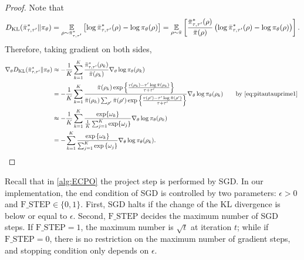 \begin{proof}
	Note that
	\begin{equation*}
	\label{eq:importance_sampling_kl}
	D_{\mathrm{KL}}(\bar{\pi}_{\tau,\tau^{\prime}}^* \| \pi_\theta) = \operatorname*{\mathbb{E}}_{\rho \sim \bar{\pi}_{\tau,\tau^{\prime}}^* } \left[ \log \bar{\pi}_{\tau,\tau^{\prime}}^*(\rho) - \log \pi_\theta(\rho) \right] = \operatorname*{\mathbb{E}}_{\rho\sim \bar{\pi}} \left[  \frac{\bar{\pi}_{\tau,\tau^{\prime}}^*(\rho)}{\bar{\pi}(\rho)} \left(\log \bar{\pi}_{\tau,\tau^{\prime}}^*(\rho) - \log \pi_\theta(\rho) \right) \right].
	\end{equation*}	
	Therefore, taking gradient on both sides,
	\begin{equation}
	\begin{split}
	\nabla_{\theta} \KL(\bar{\pi}_{\tau,\tau^{\prime}}^* \| \pi_\theta) &\approx -\frac{1}{K}\sum_{k=1}^K \frac{\bar{\pi}_{\tau,\tau^{\prime}}^* (\rho_k)}{\refPi(\rho_k)} \nabla_{\theta} \log \pi_\theta(\rho_k)\\ 
	&= -\frac{1}{K}\sum_{k=1}^K \frac{ \refPi(\rho_k) \exp\left\{ \frac{r(\rho_k)-\tau^{\prime} \log \refPi(\rho_k) }{ \tau+\tau^{\prime}} \right\} }{\refPi(\rho_k)  \sum_{\rho^{\prime}}{\refPi(\rho^{\prime}) \exp\left\{ \frac{r(\rho^{\prime})-\tau^{\prime} \log \refPi(\rho^{\prime})}{ \tau+\tau^{\prime}} \right\} }  } \nabla_{\theta} \log \pi_\theta(\rho_k) \qquad \text{by \cref{eq:pitautauprime1} }  \\
	&\approx -\frac{1}{K}\sum_{k=1}^K \frac{\exp \{\omega_k\}} {\frac{1}{K} \sum_{j=1}^K \exp \{\omega_j\}} \nabla_{\theta} \log \pi_\theta(\rho_k) \\
	&=  -\sum\limits_{k=1}^K{ \frac{ \exp\left\{ \omega_k \right\} }{ \sum_{j=1}^K{ \exp\left\{ \omega_j \right\}}} \nabla_{\theta} \log{\pi_\theta(\rho_k)} } \qedhere.
	\end{split}
	\end{equation}
\end{proof}

Recall that in \cref{alg:ECPO} the project step is performed by SGD. In our implementation, the end condition of SGD is controlled by two parameters: $\epsilon > 0$ and $\text{F\_STEP}\in \{0,1 \}$. First, SGD halts if the change of the KL divergence is below or equal to $\epsilon$. Second, $\text{F\_STEP}$ decides the maximum number of SGD steps. If $\text{F\_STEP}=1$, the maximum number is $\sqrt{t}$ at iteration $t$; while if $\text{F\_STEP}=0$, there is no restriction on the maximum number of gradient steps, and stopping condition only depends on $\epsilon$.

